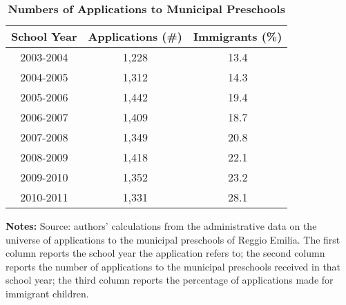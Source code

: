 
\begin{table}[ht!]
\caption{\textbf{\small Numbers of Applications to Municipal Preschools}}
\label{tab:NumApps}
\begin{center}
\begin{tabular}{ccc}
\hline\hline
\textbf{School Year} & \textbf{Applications (\#)} & \textbf{Immigrants (\%)} \\
\hline
2003-2004 & 1,228 & 13.4 \\[0.2em]
2004-2005 & 1,312 & 14.3 \\[0.2em]
2005-2006 & 1,442 & 19.4 \\[0.2em]
2006-2007 & 1,409 & 18.7 \\[0.2em]
2007-2008 & 1,349 & 20.8 \\[0.2em]
2008-2009 & 1,418 & 22.1 \\[0.2em]
2009-2010 & 1,352 & 23.2 \\[0.2em]
2010-2011 & 1,331 & 28.1 \\[0.2em]
\hline
\end{tabular}
\end{center}
\begin{flushleft}
\tiny{{\bfseries Notes:} Source: authors' calculations from the administrative data on the universe of applications to the municipal preschools of Reggio Emilia. The first column reports the school year the application refers to; the second column reports the number of applications to the municipal preschools received in that school year; the third column reports the percentage of applications made for immigrant children.}
\end{flushleft}
\end{table}
